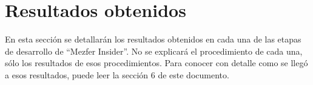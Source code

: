 \chapter{Resultados obtenidos}
\setcounter{figure}{49}
En esta sección se detallarán los resultados obtenidos en cada una de las etapas de desarrollo de ``Mezfer Insider''. No se explicará el procedimiento de cada una, sólo los resultados de esos procedimientos. Para conocer con detalle como se llegó a esos resultados, puede leer la sección 6 de este documento.
    
    
    
    
    